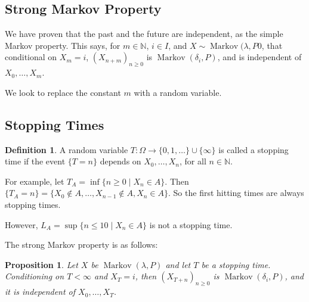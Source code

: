 \documentclass[12pt]{article}
\DeclareMathOperator{\Mkv}{Markov}
\newtheorem{proposition}{Proposition}[section]
\theoremstyle{definition}
\newtheorem{definition}{Definition}[section]
\theoremstyle{remark}
\begin{document}
\subsection{Strong Markov Property}%
\label{sub:strong_markov_property}

We have proven that the past and the future are independent, as the simple Markov property. This says, for $m \in \mathbb{N}$, $i \in I$, and $X \sim \Mkv(\lambda, P0$, that conditional on $X_m = i$, $(X_{n+m})_{n \geq 0}$ is $\Mkv(\delta_i, P)$, and is independent of $X_0, \ldots, X_m$.

We look to replace the constant $m$ with a random variable.

\subsection{Stopping Times}%
\label{sub:stopping_times}

\begin{definition}
	A random variable $T : \Omega \to \{0, 1, \ldots\} \cup \{\infty\}$ is called a stopping time if the event $\{T = n\}$ depends on $X_0, \ldots, X_n$, for all $n \in \mathbb{N}$.
\end{definition}

For example, let $T_A = \inf\{n \geq 0 \mid X_n \in A\}$. Then $\{T_A = n\} = \{X_0 \not \in A, \ldots, X_{n-1} \not \in A, X_n \in A\}$. So the first hitting times are always stopping times.

However, $L_A = \sup\{n \leq 10 \mid X_n \in A\}$ is not a stopping time.

The strong Markov property is as follows:
\begin{proposition}
	Let $X$ be $\Mkv(\lambda, P)$ and let $T$ be a stopping time. Conditioning on $T < \infty$ and $X_T = i$, then $(X_{T + n})_{n \geq 0}$ is $\Mkv(\delta_i, P)$, and it is independent of $X_0, \ldots, X_T$.
\end{proposition}


\newpage

\printindex
\end{document}
